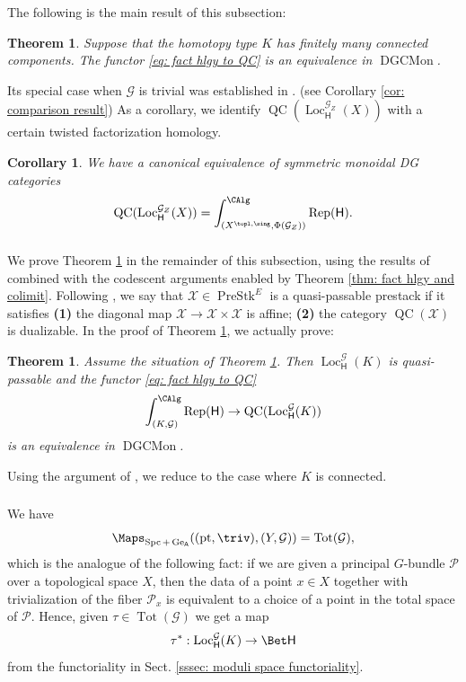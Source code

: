 \documentclass[10pt]{amsart}
\newcommand{\sssec}{\subsubsection}
\newtheorem{thm}[subsubsection]{Theorem}
\newtheorem{cor}[subsubsection]{Corollary}
\theoremstyle{remark}
\newcommand{\cP}{\mathcal{P}}
\newcommand{\on}{\operatorname}
\newcommand{\cG}{\mathcal{G}}
\newcommand{\cX}{\mathcal{X}}
\newcommand{\DGCatSymMon}{\on{DGCMon}}
\newcommand{\Rep}{\on{Rep}}
\newcommand{\QC}{\on{QC}}
\newcommand{\Loc}{\on{Loc}}
\newcommand{\PreStk}{\on{PreStk}}
\newcommand{\Spc}{\on{Spc}}
\newcommand{\pt}{\on{pt}}
\newcommand{\sffH}{\mathsf{H}}
\newcommand{\sfA}{\mathsf{A}}
\begin{document}
The following is the main result of this subsection:


\begin{thm}\label{thm: QC over twlocsys as a tw fact hlgy}
    Suppose that the homotopy type $K$ has finitely many connected components. The functor \eqref{eq: fact hlgy to QC} is an equivalence in $\DGCatSymMon$. 
\end{thm}

Its special case when $\cG$ is trivial was established in \cite[Theorem 1.5.5]{GKRV}. (see Corollary \ref{cor: comparison result}) As a corollary, we identify $\QC(\Loc^{\cG_Z}_\sffH(X))$ with a certain twisted factorization homology.

\begin{cor}
    We have a canonical equivalence of symmetric monoidal DG categories
    \[\QC(\Loc^{\cG_Z}_\sffH(X))=\int^{\CAlg}_{(X^{\topl,\sing},\Phi(\cG_Z))}\Rep(\sffH).\]
\end{cor}







\sssec{}
We prove Theorem \ref{thm: QC over twlocsys as a tw fact hlgy} in the remainder of this subsection, using the results of \cite{GKRV} combined with the codescent arguments enabled by Theorem \ref{thm: fact hlgy and colimit}. Following \cite[Chapter 4,  Sect. 3.5.1]{GR}, we say that $\cX\in\PreStk^E$ is a quasi-passable prestack if it satisfies \textbf{(1)} the diagonal map $\cX\rightarrow \cX\times \cX$ is affine; \textbf{(2)} the category $\QC(\cX)$ is dualizable.
In the proof of Theorem \ref{thm: QC over twlocsys as a tw fact hlgy}, we actually prove:
\begin{thm}\label{thm: twlocsys quasi passable}
    Assume the situation of Theorem \ref{thm: QC over twlocsys as a tw fact hlgy}. Then $\Loc^{\cG}_\sffH(K)$ is quasi-passable and the functor \eqref{eq: fact hlgy to QC}
    \[\int^{\CAlg}_{(K,\cG)}\Rep(\sffH)\rightarrow \QC(\Loc^{\cG}_\sffH(K))\]
    is an equivalence in $\DGCatSymMon$.
\end{thm}

Using the argument of \cite[Sect. 1.6.6]{GKRV}, we reduce to the case where $K$ is connected.



\sssec{}
We have
\[\Maps_{\Spc+\on{Ge}_{\sfA}}((\pt,\triv),(Y,\cG))=\on{Tot}(\cG),\]
which is the analogue of the following fact: if we are given a principal $G$-bundle $\cP$ over a topological space $X$, then the data of a point $x\in X$ together with trivialization of the fiber $\cP_x$ is equivalent to a choice of a point in the total space of $\cP$. Hence, given $\tau\in \on{Tot}(\cG)$ we get a map
\begin{equation}\label{eq: tau evaluation map}
    \tau^*:\Loc^{\cG}_\sffH(K)\rightarrow \Bet \sffH
\end{equation}
from the functoriality in Sect. \ref{sssec: moduli space functoriality}.
\medskip
\end{document}
